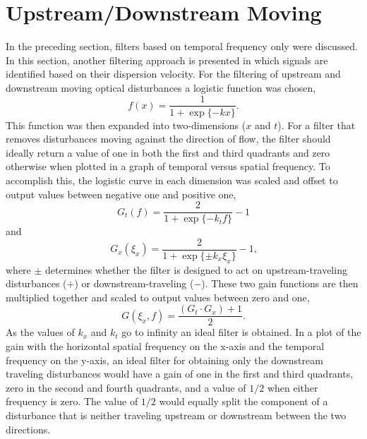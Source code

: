 \section{Upstream/Downstream Moving}
\label{chap:06_up_down_filter}
In the preceding section, filters based on temporal frequency only were discussed. In this section, another filtering approach is presented in which signals are identified based on their dispersion velocity.
For the filtering of upstream and downstream moving optical disturbances a logistic function was chosen,
\begin{equation}
 f(x) = \frac{1}{1+\exp\{-kx\}} \textrm{.}
 \label{eqn:06_logistic}
\end{equation}
This function was then expanded into two-dimensions ($x$ and $t$).
For a filter that removes disturbances moving against the direction of flow, the filter should ideally return a value of one in both the first and third quadrants and zero otherwise when plotted in a graph of temporal versus spatial frequency.
To accomplish this, the logistic curve in each dimension was scaled and offset to output values between negative one and positive one,
\begin{equation}
 G_t(f) = \frac{2}{1+\exp\{-k_tf\}}-1
 \label{eqn:06_logistic_time}
\end{equation}
and
\begin{equation}
 G_x(\xi_x) = \frac{2}{1+\exp\{\pm k_x\xi_x\}}-1 \textrm{,}
 \label{eqn:06_logistic_space}
\end{equation}
where $\pm$ determines whether the filter is designed to act on upstream-traveling disturbances ($+$) or downstream-traveling ($-$).
These two gain functions are then multiplied together and scaled to output values between zero and one,
\begin{equation}
 G(\xi_x,f) = \frac{(G_t\cdot G_x)+1}{2} \textrm{.}
 \label{eqn:06_up_down_filter}
\end{equation}
As the values of $k_x$ and $k_t$ go to infinity an ideal filter is obtained.
In a plot of the gain with the horizontal spatial frequency on the x-axis and the temporal frequency on the y-axis, an ideal filter for obtaining only the downstream traveling disturbances would have a gain of one in the first and third quadrants, zero in the second and fourth quadrants, and a value of $1/2$ when either frequency is zero.
The value of $1/2$ would equally split the component of a disturbance that is neither traveling upstream or downstream between the two directions.

